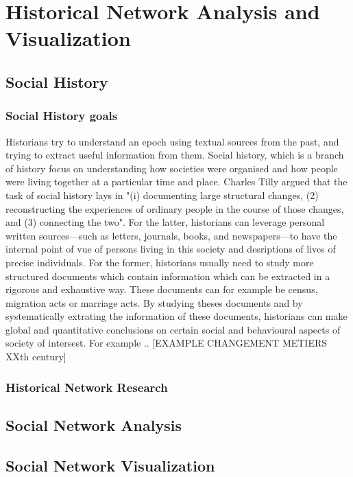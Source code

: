 
\section{Historical Network Analysis and Visualization}

\subsection{Social History}

\subsubsection{Social History goals}

Historians try to understand an epoch using textual sources from the past, and trying to extract useful information from them.
Social history, which is a branch of history focus on understanding how societies were organised and how people were living together at a particular time and place. Charles Tilly argued that the task of social history lays in "(i) documenting large structural changes, (2) reconstructing the experiences of ordinary people in the course of those changes, and (3) connecting the two". For the latter, historians can leverage personal written sources---such as letters, journals, books, and newspapers---to have the internal point of vue of persons living in this society and desriptions of lives of precise individuals.
For the former, historians usually need to study more structured documents which contain information which can be extracted in a rigorous and exhaustive way. These documents can for example be census, migration acts or marriage acts. By studying theses documents and by systematically extrating the information of these documents, historians can make global and quantitative conclusions on certain social and behavioural aspects of society of intersest.
For example .. [EXAMPLE CHANGEMENT METIERS XXth century]

\subsubsection{Historical Network Research}



\subsection{Social Network Analysis}




\subsection{Social Network Visualization}




